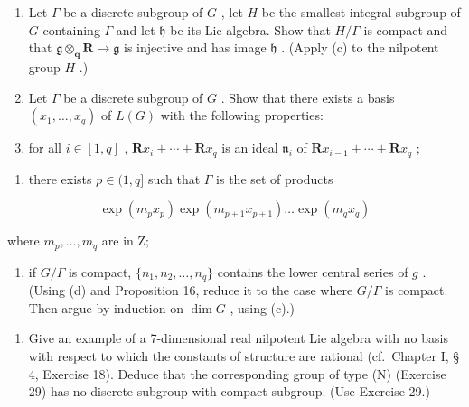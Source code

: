 \begin{enumerate}
\def\labelenumi{(\alph{enumi})}
\setcounter{enumi}{3}
\item
  Let \(\Gamma\) be a discrete subgroup of \(G\) , let \(H\) be the smallest integral subgroup of \(G\) containing \(\Gamma\) and let \(\mathfrak{h}\) be its Lie algebra. Show that \(H / \Gamma\) is compact and that \(\mathfrak{g} \otimes_{\mathbf{q}} \mathbf{R} \to \mathfrak{g}\) is injective and has image \(\mathfrak{h}\) . (Apply (c) to the nilpotent group \(H\) .)
\item
  Let \(\Gamma\) be a discrete subgroup of \(G\) . Show that there exists a basis \((x_{1},\ldots ,x_{q})\) of \(L(G)\) with the following properties:
\item
  for all \(i \in [1, q]\) , \(\mathbf{R}x_i + \cdots + \mathbf{R}x_q\) is an ideal \(\mathfrak{n}_i\) of \(\mathbf{R}x_{i-1} + \cdots + \mathbf{R}x_q\) ;
\end{enumerate}

\begin{enumerate}
\def\labelenumi{(\roman{enumi})}
\setcounter{enumi}{1}
\tightlist
\item
  there exists \(p \in (1, q]\) such that \(\Gamma\) is the set of products
\end{enumerate}

\[
\exp (m _ {p} x _ {p}) \exp (m _ {p + 1} x _ {p + 1}) \dots \exp (m _ {q} x _ {q})
\]

where \(m_{p}, \ldots, m_{q}\) are in Z;

\begin{enumerate}
\def\labelenumi{(\roman{enumi})}
\setcounter{enumi}{2}
\tightlist
\item
  if \(G / \Gamma\) is compact, \(\{n_1, n_2, \ldots, n_q\}\) contains the lower central series of \(g\) . (Using (d) and Proposition 16, reduce it to the case where \(G / \Gamma\) is compact. Then argue by induction on \(\dim G\) , using (c).)
\end{enumerate}

\begin{enumerate}
\def\labelenumi{(\arabic{enumi})}
\setcounter{enumi}{29}
\tightlist
\item
  Give an example of a 7-dimensional real nilpotent Lie algebra with no basis with respect to which the constants of structure are rational (cf.~Chapter I, § 4, Exercise 18). Deduce that the corresponding group of type (N) (Exercise 29) has no discrete subgroup with compact subgroup. (Use Exercise 29.)
\end{enumerate}

